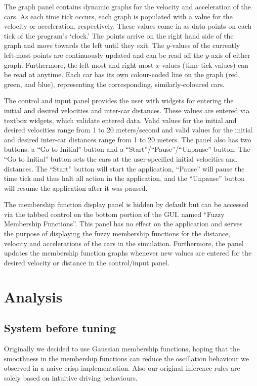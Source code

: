 \documentclass[12pt,letterpaper,oneside]{report}
\begin{document}
The graph panel contains dynamic graphs for the velocity and acceleration
of the cars. As each time tick occurs, each graph is populated with a value
for the velocity or acceleration, respectively. These values come in as 
data points on each tick of the program's `clock.' The points arrive on 
the right hand side of the graph and move towards the left until they exit.
The $y$-values of the currently left-most points are continuously updated and
can be read off the $y$-axis of either graph. Furthermore, the left-most and
right-most $x$-values (time tick values) can be read at anytime. Each car has
its own colour-coded line on the graph (red, green, and blue), representing
the corresponding, similarly-coloured cars. 

The control and input panel provides the user with widgets for entering the
initial and desired velocities and inter-car distances. These values are
entered via textbox widgets, which validate entered data. Valid values
for the initial and desired velocities range from 1 to 20 meters/second 
and valid values for the initial and desired inter-car distances range 
from 1 to 20 meters. The panel also has two buttons: a ``Go to Initial''
button and a ``Start''/``Pause''/``Unpause'' button. The ``Go to Initial''
button sets the cars at the user-specified initial velocities and distances.
The ``Start'' button will start the application, ``Pause'' will pause the
time tick and thus halt all action in the application, and the ``Unpause''
button will resume the application after it was paused.

The membership function display panel is hidden by default but can 
be accessed via the tabbed control on the bottom portion of the GUI, named
``Fuzzy Membership Functions''. This panel has no effect on the application
and serves the purpose of displaying the fuzzy membership functions for the
distance, velocity and accelerations of the cars in the simulation. Furthermore,
the panel updates the membership function graphs whenever new values 
are entered for the desired velocity or distance in the control/input panel. 

\clearpage
\section{Analysis}

\subsection{System before tuning}
Originally we decided to use Gaussian membership functions, hoping that the
smoothness in the membership functions can reduce the oscillation behaviour we
observed in a naive crisp implementation. Also our original inference rules are
solely based on intuitive driving behaviours. 
\end{document}

